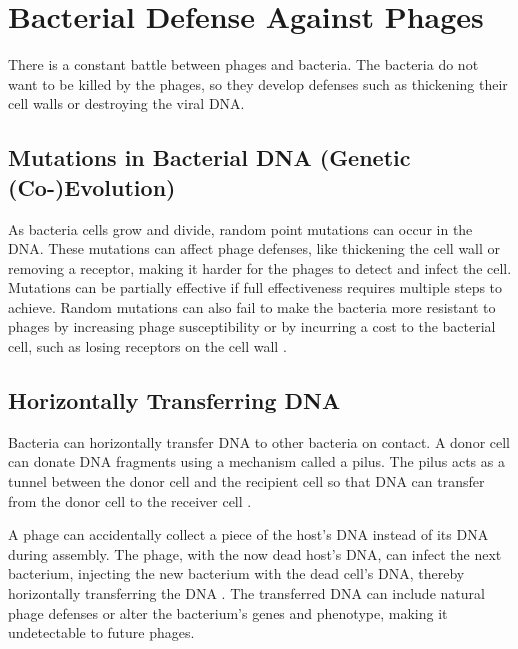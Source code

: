 \section{Bacterial Defense Against Phages} 
\label{sec:literaturereview:bacterial_defense_against_phages}
There is a constant battle between phages and bacteria. 
The bacteria do not want to be killed by the phages, so they develop defenses such as thickening their cell walls or destroying the viral DNA. 

\subsection{Mutations in Bacterial DNA (Genetic (Co-)Evolution)}
As bacteria cells grow and divide, random point mutations can occur in the DNA. 
These mutations can affect phage defenses, like thickening the cell wall or removing a receptor, making it harder for the phages to detect and infect the cell. 
Mutations can be partially effective if full effectiveness requires multiple steps to achieve. 
Random mutations can also fail to make the bacteria more resistant to phages by increasing phage susceptibility or by incurring a cost to the bacterial cell, such as losing receptors on the cell wall \cite{lenskiTWOSTEPRESISTANCEESCHERICHIA1984}. 

\subsection{Horizontally Transferring DNA}
Bacteria can horizontally transfer DNA to other bacteria on contact. 
A donor cell can donate DNA fragments using a mechanism called a pilus. 
The pilus acts as a tunnel between the donor cell and the recipient cell so that DNA can transfer from the donor cell to the receiver cell \cite{harbSsRNAPhagePenetration2020}. 

A phage can accidentally collect a piece of the host’s DNA instead of its DNA during assembly. 
The phage, with the now dead host’s DNA, can infect the next bacterium, injecting the new bacterium with the dead cell’s DNA, thereby horizontally transferring the DNA \cite{tamangHorizontalGeneTransfer2023, kasmanBacteriophages2025}. 
The transferred DNA can include natural phage defenses or alter the bacterium’s genes and phenotype, making it undetectable to future phages. 

